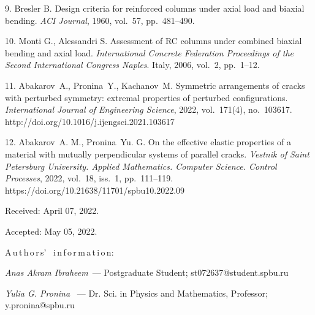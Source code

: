 {9. Bresler B. Design criteria for reinforced columns under axial load and biaxial bending. \textit{ACI Journal}, 1960, vol.~57, pp.~481--490.

10. Monti G., Alessandri S. Assessment of RC columns under combined biaxial bending and axial load. \textit{International Concrete Federation Proceedings of the Second International Congress Naples}. Italy, 2006, vol.~2, pp.~1--12.

11. Abakarov~A., Pronina~Y., Kachanov~M. Symmetric arrangements of cracks with perturbed symmetry: extremal properties of perturbed configurations. \textit{International Journal of Engineering Science}, 2022, vol.~171(4), no.~103617. %
http://doi.org/10.1016/j.ijengsci.2021.103617

12. Abakarov~A. M., Pronina~Yu. G. On the effective elastic properties of a material with mutually perpendicular systems of parallel cracks. {\it Vestnik of Saint Petersburg University. Applied Mathematics. Computer Science. Control Processes}, 2022, vol.~18, iss.~1, pp.~111--119.\\ https://doi.org/10.21638/11701/spbu10.2022.09

\vskip 1.5mm

%


Received:  April 07, 2022.

Accepted: May 05, 2022.

\vskip 6mm


A\,u\,t\,h\,o\,r\,s' \ i\,n\,f\,o\,r\,m\,a\,t\,i\,o\,n:


\vskip 2mm \textit{Anas Akram Ibraheem}~--- Postgraduate Student; st072637@student.spbu.ru \par

\vskip 2mm \textit{Yulia G. Pronina }~---  Dr. Sci. in Physics and Mathematics, Professor; y.pronina@spbu.ru \par
%
}
